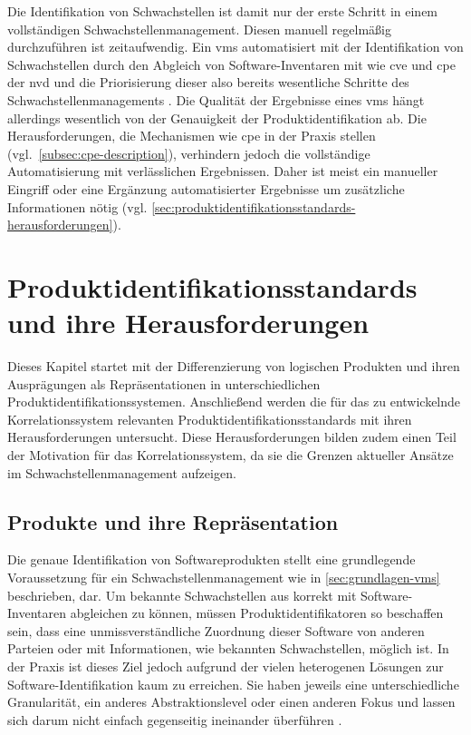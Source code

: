 Die Identifikation von Schwachstellen ist damit nur der erste Schritt in einem vollständigen Schwachstellenmanagement.
Diesen manuell regelmäßig durchzuführen ist zeitaufwendig.
Ein \acrshort{vms} automatisiert mit der Identifikation von Schwachstellen durch den Abgleich von Software-Inventaren mit  wie \acrshort{cve} und \acrshort{cpe} der \acrshort{nvd} und die Priorisierung dieser also bereits wesentliche Schritte des Schwachstellenmanagements \autocite{Idrissi_Sebai_Faroukhi_Mahouachi_2024}.
Die Qualität der Ergebnisse eines \acrshort{vms} hängt allerdings wesentlich von der Genauigkeit der Produktidentifikation ab.
Die Herausforderungen, die Mechanismen wie \acrshort{cpe} in der Praxis stellen (vgl.\ \autoref{subsec:cpe-description}), verhindern jedoch die vollständige Automatisierung mit verlässlichen Ergebnissen.
Daher ist meist ein manueller Eingriff oder eine Ergänzung automatisierter Ergebnisse um zusätzliche Informationen nötig (vgl. \autoref{sec:produktidentifikationsstandards-herausforderungen}).


\section{Produktidentifikationsstandards und ihre Herausforderungen}\label{sec:produktidentifikationsstandards-herausforderungen}

Dieses Kapitel startet mit der Differenzierung von logischen Produkten und ihren Ausprägungen als Repräsentationen in unterschiedlichen Produktidentifikationssystemen.
Anschließend werden die für das zu entwickelnde Korrelationssystem relevanten Produktidentifikationsstandards mit ihren Herausforderungen untersucht.
Diese Herausforderungen bilden zudem einen Teil der Motivation für das Korrelationssystem, da sie die Grenzen aktueller Ansätze im Schwachstellenmanagement aufzeigen.

\subsection{Produkte und ihre Repräsentation}\label{subsec:produkte-vs-reprasentation}

Die genaue Identifikation von Softwareprodukten stellt eine grundlegende Voraussetzung für ein Schwachstellenmanagement wie in \autoref{sec:grundlagen-vms} beschrieben, dar.
Um bekannte Schwachstellen aus  korrekt mit Software-Inventaren abgleichen zu können, müssen Produktidentifikatoren so beschaffen sein, dass eine unmissverständliche Zuordnung dieser Software von anderen Parteien oder mit Informationen, wie bekannten Schwachstellen, möglich ist.
In der Praxis ist dieses Ziel jedoch aufgrund der vielen heterogenen Lösungen zur Software-Identifikation kaum zu erreichen.
Sie haben jeweils eine unterschiedliche Granularität, ein anderes Abstraktionslevel oder einen anderen Fokus und lassen sich darum nicht einfach gegenseitig ineinander überführen \autocite{CISA2023}.

